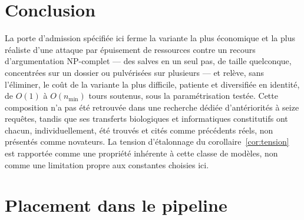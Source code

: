 \documentclass[11pt]{article}
\begin{document}
\section{Conclusion}

La porte d'admission spécifiée ici ferme la variante la plus économique
et la plus réaliste d'une attaque par épuisement de ressources contre un
recours d'argumentation NP-complet --- des salves en un seul pas, de
taille quelconque, concentrées sur un dossier ou pulvérisées sur
plusieurs --- et relève, sans l'éliminer, le coût de la variante la plus
difficile, patiente et diversifiée en identité, de $O(1)$ à
$O(n_{\min})$ tours soutenus, sous la paramétrisation testée. Cette
composition n'a pas été retrouvée dans une recherche dédiée
d'antériorités à seize requêtes, tandis que ses transferts biologiques et
informatiques constitutifs ont chacun, individuellement, été trouvés et
cités comme précédents réels, non présentés comme novateurs. La tension
d'étalonnage du corollaire~\ref{cor:tension} est rapportée comme une
propriété inhérente à cette classe de modèles, non comme une limitation
propre aux constantes choisies ici.

\appendix
\section{Placement dans le pipeline}

\begin{center}
\end{center}
\end{document}
